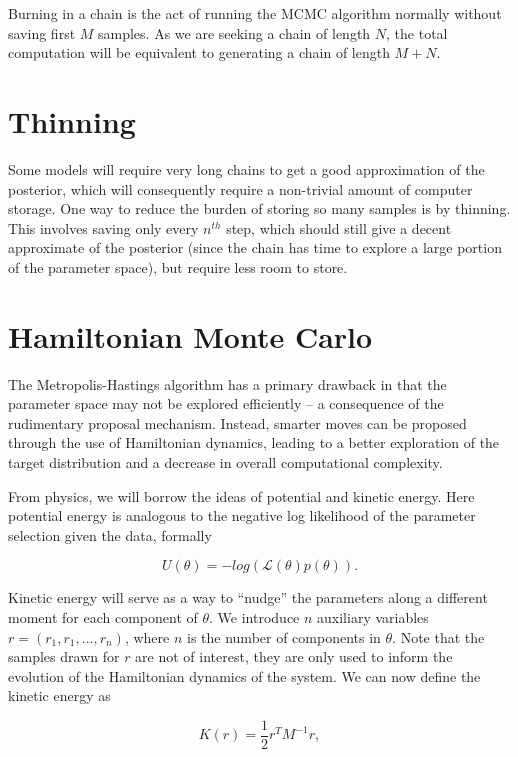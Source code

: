     Burning in a chain is the act of running the MCMC algorithm normally without saving first $M$ samples. As we are seeking a chain of length $N$, the total computation will be equivalent to generating a chain of length $M+N$.


\section{Thinning}

    Some models will require very long chains to get a good approximation of the posterior, which will consequently require a non-trivial amount of computer storage. One way to reduce the burden of storing so many samples is by thinning. This involves saving only every $n^{th}$ step, which should still give a decent approximate of the posterior (since the chain has time to explore a large portion of the parameter space), but require less room to store.


\section{Hamiltonian Monte Carlo}

    The Metropolis-Hastings algorithm has a primary drawback in that the parameter space may not be explored efficiently -- a consequence of the rudimentary proposal mechanism. Instead, smarter moves can be proposed through the use of Hamiltonian dynamics, leading to a better exploration of the target distribution and a decrease in overall computational complexity.

    From physics, we will borrow the ideas of potential and kinetic energy. Here potential energy is analogous to the negative log likelihood of the parameter selection given the data, formally

    \begin{equation}
        U(\theta) = -log(\mathcal{L}(\theta)p(\theta)).
    \end{equation}

    Kinetic energy will serve as a way to ``nudge'' the parameters along a different moment for each component of $\theta$. We introduce $n$ auxiliary variables $r = (r_1, r_1,...,r_n)$, where $n$ is the number of components in $\theta$. Note that the samples drawn for $r$ are not of interest, they are only used to inform the evolution of the Hamiltonian dynamics of the system. We can now define the kinetic energy as

    \begin{equation}
        K(r) = \frac{1}{2} r^T M^{-1} r,
    \end{equation}

